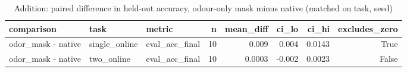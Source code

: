 \begin{table}[t]
\centering
\small
\begin{tabular}{lllrrrrr}
\toprule
comparison & task & metric & n & mean\_diff & ci\_lo & ci\_hi & excludes\_zero \\
\midrule
odor\_mask - native & single\_online & eval\_acc\_final & 10 & 0.009 & 0.004 & 0.0143 & True \\
odor\_mask - native & two\_online & eval\_acc\_final & 10 & 0.0003 & -0.002 & 0.0023 & False \\
\bottomrule
\end{tabular}
\caption{Addition: paired difference in held-out accuracy, odour-only mask minus native (matched on task, seed)}
\label{tab:dan_kc_ablation_paired}
\end{table}